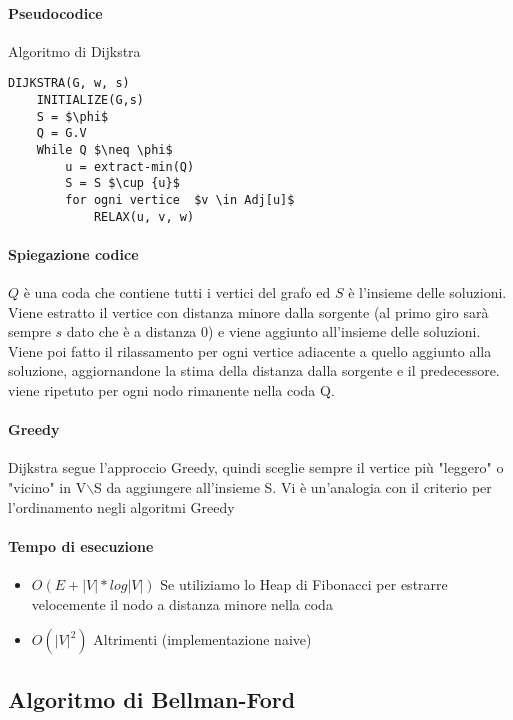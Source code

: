 \documentclass[12pt, a4paper, openany]{book}
\begin{document}
\paragraph{Pseudocodice} Algoritmo di Dijkstra

\begin{lstlisting}[mathescape=true]
DIJKSTRA(G, w, s)
    INITIALIZE(G,s)
    S = $\phi$
    Q = G.V
    While Q $\neq \phi$
        u = extract-min(Q)
        S = S $\cup {u}$
        for ogni vertice  $v \in Adj[u]$ 
            RELAX(u, v, w)
\end{lstlisting}

\paragraph{Spiegazione codice}
$Q$ è una coda che contiene tutti i vertici del grafo ed $S$ è l'insieme delle soluzioni.
Viene estratto il vertice con distanza minore dalla sorgente (al primo giro sarà sempre $s$ dato che è
a distanza 0) e viene aggiunto all'insieme delle soluzioni. Viene poi fatto il rilassamento per ogni vertice adiacente
a quello aggiunto alla soluzione, aggiornandone la stima della distanza dalla sorgente e il predecessore.
viene ripetuto per ogni nodo rimanente nella coda Q.

\paragraph{Greedy}
Dijkstra segue l'approccio Greedy, quindi sceglie sempre il vertice più "leggero" o "vicino" in V$\backslash$S
da aggiungere all'insieme S. Vi è un'analogia con il criterio per l'ordinamento negli algoritmi Greedy

\paragraph{Tempo di esecuzione}
\begin{itemize}
    \item $O(E + |V|*log|V|)$ Se utiliziamo lo Heap di Fibonacci per estrarre velocemente il nodo a distanza minore nella coda
    \item $O(|V|^2)$ Altrimenti (implementazione naive)
\end{itemize}

\subsection{Algoritmo di Bellman-Ford}
\end{document}
